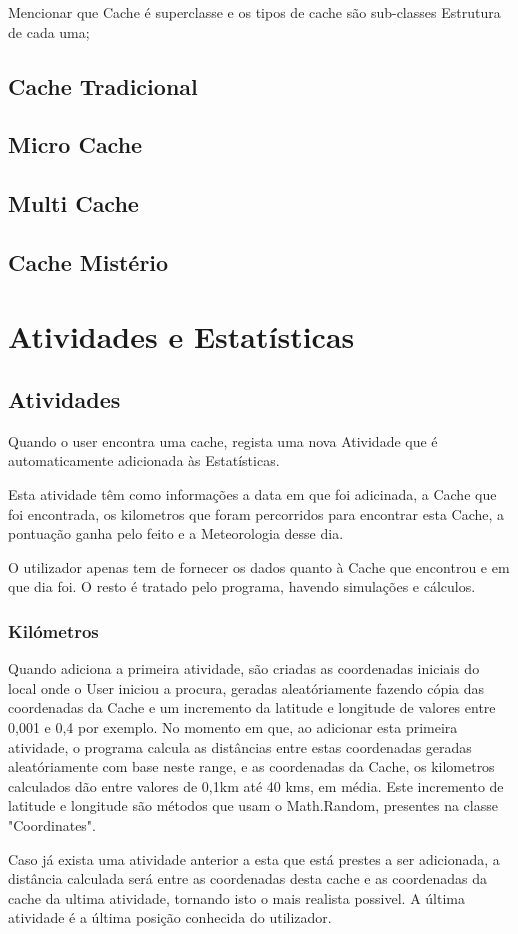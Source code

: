 \documentclass{article}
\begin{document}
Mencionar que Cache é superclasse e os tipos de cache são sub-classes Estrutura de cada uma;
\subsection{ Cache Tradicional}
\subsection{ Micro Cache }
\subsection{ Multi Cache}
\subsection{ Cache Mistério }

\pagebreak
\section{Atividades e Estatísticas}

\subsection{Atividades}
\quad Quando o user encontra uma cache, regista uma nova Atividade que é automaticamente adicionada às Estatísticas.
\par Esta atividade têm como informações a data em que foi adicinada, a Cache que foi encontrada, os kilometros que foram percorridos para encontrar esta Cache, a pontuação ganha pelo feito e a Meteorologia desse dia.
\par O utilizador apenas tem de fornecer os dados quanto à Cache que encontrou e em que dia foi. O resto é tratado pelo programa, havendo simulações e cálculos.

\subsubsection{Kilómetros}
\quad  Quando adiciona a primeira atividade, são criadas as coordenadas iniciais do local onde o User iniciou a procura, geradas aleatóriamente fazendo cópia das coordenadas da Cache e um incremento da latitude e longitude de valores entre 0,001 e 0,4 por exemplo. No momento em que, ao adicionar esta primeira atividade, o programa calcula as distâncias entre estas coordenadas geradas aleatóriamente com base neste range, e as coordenadas da Cache, os kilometros calculados dão entre valores de 0,1km até 40 kms, em média.
Este incremento de latitude e longitude são métodos que usam o Math.Random, presentes na classe "Coordinates".
\par Caso já exista uma atividade anterior a esta que está prestes a ser adicionada, a distância calculada será entre as coordenadas desta cache e as coordenadas da cache da ultima atividade, tornando isto o mais realista possivel. A última atividade é a última posição conhecida do utilizador.
\\
\end{document}
